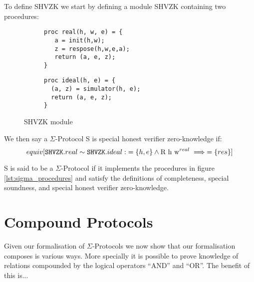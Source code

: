 \begin{definition}
  To define SHVZK we start by defining a module SHVZK containing two procedures:
\label{def:sigma:shvzk}
  \begin{figure}[ht]
    \centering
    \begin{subfigure}{0.48\textwidth }
\begin{lstlisting}[mathescape]
proc real(h, w, e) = {
   a = init(h,w);
   z = respose(h,w,e,a);
   return (a, e, z);
}
\end{lstlisting}
    \end{subfigure}
    \hfill
    \begin{subfigure}{0.48\textwidth }
\begin{lstlisting}[mathescape]
proc ideal(h, e) = {
  (a, z) = simulator(h, e);
  return (a, e, z);
}
\end{lstlisting}
    \end{subfigure}
    \caption{SHVZK module}
  \end{figure}
  We then say a $\Sigma$-Protocol S is special honest verifier zero-knowledge
  if:
  \[
    equiv[\texttt{SHVZK}.real \sim \texttt{SHVZK}.ideal :\; =\{h, e\} \land \text{R
    h w}^{real} \implies =\{res\}]
  \]
\end{definition}

\begin{definition}
\label{def:sigma-protocol}
  S is said to be a $\Sigma$-Protocol if it implements the procedures in figure
  \ref{lst:sigma_procedures} and satisfy the definitions of completeness,
  special soundness, and special honest verifier zero-knowledge.
\end{definition}




\section{Compound Protocols}
\label{sec:sigma_comp}
Given our formalisation of $\Sigma$-Protocols we now show that our formalisation
composes is various ways. More specially it is possible to prove knowledge of
relations compounded by the logical operators ``AND'' and ``OR''.
The benefit of this is...


